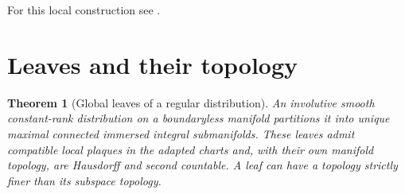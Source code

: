 \documentclass[11pt,oneside,openany]{book}
\newtheorem{theorem}{Theorem}[chapter]
\theoremstyle{definition}
\theoremstyle{remark}
\begin{document}
For this local construction see \cite[Theorem 19.12 and Corollary 19.13]{lee}.

\section{Leaves and their topology}

\begin{theorem}[Global leaves of a regular distribution]
\label{p104:M08.03}
An involutive smooth constant-rank distribution on a boundaryless manifold partitions it into unique maximal connected immersed integral submanifolds. These leaves admit compatible local plaques in the adapted charts and, with their own manifold topology, are Hausdorff and second countable. A leaf can have a topology strictly finer than its subspace topology.
\end{theorem}
\end{document}
